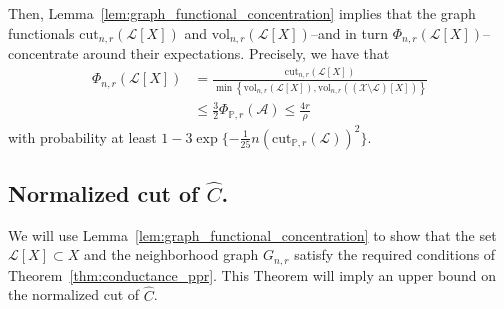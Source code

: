 \documentclass[11pt,twoside]{article}
\newcommand{\set}[1]{\left\{#1\right\}}
\newcommand{\vol}{\mathrm{vol}}
\newcommand{\cut}{\mathrm{cut}}
\newcommand{\1}{\mathbf{1}}
\newcommand{\Xbf}{X}             %
\newcommand{\Pbb}{\mathbb{P}}
\newcommand{\Aset}{\mathcal{A}}
\begin{document}
Then, Lemma~\ref{lem:graph_functional_concentration} implies that the graph functionals $\cut_{n,r}(\mathcal{L}[\Xbf])$ and $\vol_{n,r}(\mathcal{L}[\Xbf])$--and in turn $\Phi_{n,r}(\mathcal{L}[\Xbf])$-- concentrate around their expectations. Precisely, we have that 
\begin{align}
\Phi_{n,r}(\mathcal{L}[\Xbf]) & = \frac{\cut_{n,r}(\mathcal{L}[\Xbf])}{\min\set{\vol_{n,r}(\mathcal{L}[\Xbf]),\vol_{n,r}((\mathcal{X}\setminus\mathcal{L})[\Xbf])}} \nonumber \\
& \leq \frac{3}{2}\Phi_{\Pbb,r}(\Aset) \leq \frac{4 r}{\rho} \label{eqn:lb_pf2}
\end{align}
with probability at least $1 - 3\exp\{-\frac{1}{25}n(\cut_{\Pbb,r}(\mathcal{L}))^2\}$. 

\subsection{Normalized cut of $\widehat{C}$.}

We will use Lemma~\ref{lem:graph_functional_concentration} to show that the set $\mathcal{L}[X] \subset X$ and the neighborhood graph $G_{n,r}$ satisfy the required conditions of Theorem~\ref{thm:conductance_ppr}. This Theorem will imply an upper bound on the normalized cut of $\widehat{C}$. 
\end{document}
